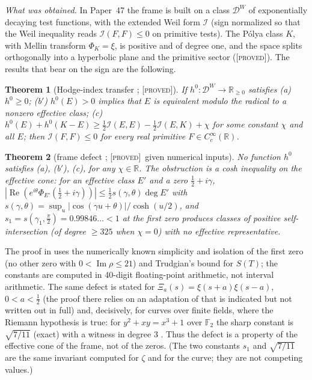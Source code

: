 \documentclass[11pt]{amsart}
\newtheorem{theorem}{Theorem}[section]
\theoremstyle{definition}
\theoremstyle{remark}
\numberwithin{equation}{section}
\newcommand{\R}{\mathbb{R}}
\DeclareMathOperator{\Rel}{Re}
\DeclareMathOperator{\Iml}{Im}
\newcommand{\stag}[1]{\textsc{[#1]}}
\newcommand{\PROVED}{\stag{proved}}
\newcommand{\entry}[1]{\par\smallskip\noindent\textit{#1.}\enspace}
\begin{document}
\entry{What was obtained} In Paper~47 the frame is built on a class $\mathcal D^W$ of exponentially decaying
test functions, with the extended Weil form $\mathcal I$ (sign normalized so that the Weil inequality reads
$\mathcal I(F,F)\le0$ on primitive tests). The P\'olya class $K$, with Mellin transform $\Phi_K=\xi$, is
positive and of degree one, and the space splits orthogonally into a hyperbolic plane and the primitive sector
\cite{P47} (\PROVED). The results that bear on the sign are the following.

\begin{theorem}[Hodge-index transfer {\cite[Theorem~6.1]{P47}}; \PROVED]\label{w7:thm:transfer}
If $h^0:\mathcal D^W\to\R_{\ge0}$ satisfies (a) $h^0\ge0$; (b$'$) $h^0(E)>0$ implies that $E$ is equivalent
modulo the radical to a nonzero effective class; (c) $h^0(E)+h^0(K-E)\ge\frac12\mathcal I(E,E)-\frac12\mathcal
I(E,K)+\chi$ for some constant $\chi$ and all $E$; then $\mathcal I(F,F)\le0$ for every real primitive
$F\in C_c^\infty(\R)$.
\end{theorem}

\begin{theorem}[frame defect {\cite[Theorems~8.6 and 8.8]{P47}}; \PROVED\ given numerical inputs]\label{w7:thm:defect}
No function $h^0$ satisfies (a), (b$'$), (c), for any $\chi\in\R$. The obstruction is a cosh inequality on the
effective cone: for an effective class $E'$ and a zero $\frac12+i\gamma$,
$|\Rel(e^{i\theta}\Phi_{E'}(\frac12+i\gamma))|\le\frac12 s(\gamma,\theta)\deg E'$ with
$s(\gamma,\theta)=\sup_u|\cos(\gamma u+\theta)|/\cosh(u/2)$, and $s_1=s(\gamma_1,\frac\pi2)=0.99846\ldots<1$ at
the first zero produces classes of positive self-intersection (of degree $\ge325$ when $\chi=0$) with no
effective representative.
\end{theorem}

The proof in \cite{P47} uses the numerically known simplicity and isolation of the first zero (no other zero
with $0<\Iml\rho\le21$) and Trudgian's bound for $S(T)$; the constants are computed in 40-digit floating-point
arithmetic, not interval arithmetic. The same defect is stated for $\Xi_a(s)=\xi(s+a)\xi(s-a)$,
$0<a<\frac12$ \cite[Theorem~9.4]{P47} (the proof there relies on an adaptation of \cite[Theorem~6.2]{P45} that
is indicated but not written out in full) and, decisively, for curves over finite fields, where the Riemann hypothesis is true:
for $y^2+xy=x^3+1$ over $\mathbb F_2$ the sharp constant is $\sqrt{7/11}$ (exact) with a witness in degree $3$
\cite[Proposition~10.7, Theorem~10.8]{P47}. Thus the defect is a property of the effective cone of the frame,
not of the zeros. (The two constants $s_1$ and $\sqrt{7/11}$ are the same invariant computed for $\zeta$ and for
the curve; they are not competing values.)
\end{document}
